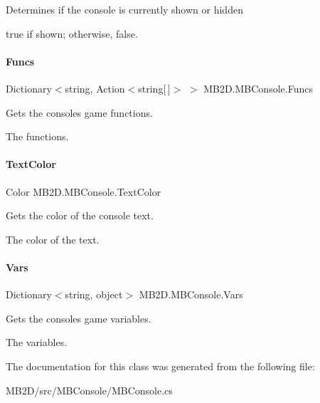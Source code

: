 Determines if the console is currently shown or hidden 

{\ttfamily true} if shown; otherwise, {\ttfamily false}.\hypertarget{class_m_b2_d_1_1_m_b_console_a11915e9941920f0fbe8457b90dcdcfc7}{}\label{class_m_b2_d_1_1_m_b_console_a11915e9941920f0fbe8457b90dcdcfc7} 
\paragraph{\texorpdfstring{Funcs}{Funcs}}
{\footnotesize\ttfamily Dictionary$<$string, Action$<$string\mbox{[}$\,$\mbox{]}$>$ $>$ M\+B2\+D.\+M\+B\+Console.\+Funcs\hspace{0.3cm}{\ttfamily [get]}}



Gets the consoles game functions. 

The functions.\hypertarget{class_m_b2_d_1_1_m_b_console_a41089b46b4c440409ccc0018b8a4c822}{}\label{class_m_b2_d_1_1_m_b_console_a41089b46b4c440409ccc0018b8a4c822} 
\paragraph{\texorpdfstring{Text\+Color}{TextColor}}
{\footnotesize\ttfamily Color M\+B2\+D.\+M\+B\+Console.\+Text\+Color\hspace{0.3cm}{\ttfamily [get]}}



Gets the color of the console text. 

The color of the text.\hypertarget{class_m_b2_d_1_1_m_b_console_ac36d5c946f44dc58c82b9ade6c5f689c}{}\label{class_m_b2_d_1_1_m_b_console_ac36d5c946f44dc58c82b9ade6c5f689c} 
\paragraph{\texorpdfstring{Vars}{Vars}}
{\footnotesize\ttfamily Dictionary$<$string, object$>$ M\+B2\+D.\+M\+B\+Console.\+Vars\hspace{0.3cm}{\ttfamily [get]}}



Gets the consoles game variables. 

The variables.

The documentation for this class was generated from the following file\+:\begin{DoxyCompactItemize}
\item 
M\+B2\+D/src/\+M\+B\+Console/M\+B\+Console.\+cs\end{DoxyCompactItemize}
